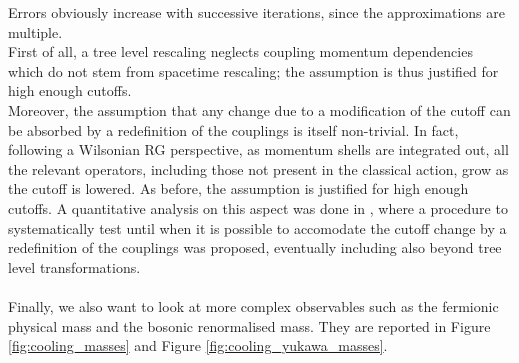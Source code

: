 Errors obviously increase with successive iterations, since the approximations are multiple. \\
First of all, a tree level rescaling neglects coupling momentum dependencies which do not stem from spacetime rescaling; the assumption is thus justified for high enough cutoffs. \\
Moreover, the assumption that any change due to a modification of the cutoff can be absorbed by a redefinition of the couplings is itself non-trivial. In fact, following a Wilsonian RG perspective, as momentum shells are integrated out, 
all the relevant operators, including those not present in the classical action, grow as the cutoff is lowered. As before, the assumption is justified for high enough cutoffs.
A quantitative analysis on this aspect was done in \cite{Pawlowski2017CoolingNoise}, where a procedure to 
systematically test until when it is possible to accomodate the cutoff change by a redefinition of the couplings was proposed, eventually including also beyond tree level transformations. \\~\\
Finally, we also want to look at more complex observables such as the fermionic physical mass and the bosonic renormalised mass. They are reported in Figure \ref{fig:cooling_masses} and Figure \ref{fig:cooling_yukawa_masses}. 
